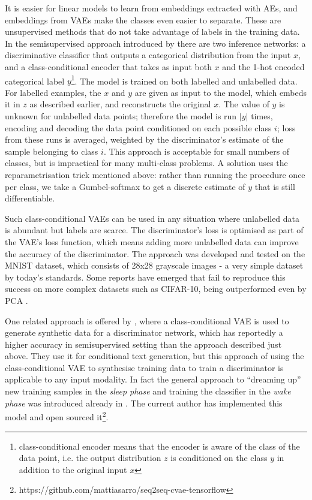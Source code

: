 It is easier for linear models to learn from embeddings extracted with AEs, and embeddings from VAEs make the classes even easier to separate.
These are unsupervised methods that do not take advantage of labels in the training data.
In the semisupervised approach introduced by \cite{semi_vae} there are two inference networks: a discriminative classifier that outputs a categorical distribution from the input $x$, and a class-conditional encoder that takes as input both $x$ and the 1-hot encoded categorical label $y$\footnote{class-conditional encoder means that the encoder is aware of the class of the data point, i.e. the output distribution $z$ is conditioned on the class $y$ in addition to the original input $x$}.
The model is trained on both labelled and unlabelled data.
For labelled examples, the $x$ and $y$ are given as input to the model, which embeds it in $z$ as described earlier, and reconstructs the original $x$.
The value of $y$ is unknown for unlabelled data points; therefore the model is run $|y|$ times, encoding and decoding the data point conditioned on each possible class $i$; loss from these runs is averaged, weighted by the discriminator's estimate of the sample belonging to class $i$.
This approach is acceptable for small numbers of classes, but is impractical for many multi-class problems.
A solution uses the reparametrisation trick mentioned above: rather than running the procedure once per class, we take a Gumbel-softmax \cite{gumbel} to get a discrete estimate of $y$ that is still differentiable.

Such class-conditional VAEs can be used in any situation where unlabelled data is abundant but labels are scarce.
The discriminator's loss is optimised as part of the VAE's loss function, which means adding more unlabelled data can improve the accuracy of the discriminator.
The approach was developed and tested on the MNIST dataset, which consists of 28x28 grayscale images - a very simple dataset by today's standards.
Some reports have emerged that fail to reproduce this success on more complex datasets such as CIFAR-10, being outperformed even by PCA \cite{vae_bad}.

One related approach is offered by \cite{towards}, where a class-conditional VAE is used to generate synthetic data for a discriminator network, which has reportedly a higher accuracy in semisupervised setting than the approach described just above.
They use it for conditional text generation, but this approach of using the class-conditional VAE to synthesise training data to train a discriminator is applicable to any input modality.
In fact the general approach to ``dreaming up'' new training samples in the \textit{sleep phase} and training the classifier in the \textit{wake phase} was introduced already in \cite{wake_sleep}.
The current author has implemented this model and open sourced it\footnote{https://github.com/mattiasarro/seq2seq-cvae-tensorflow}.

